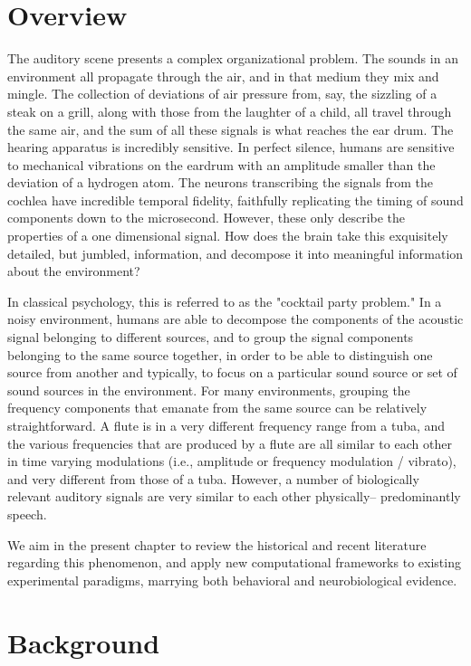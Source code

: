 \section{Overview}

The auditory scene presents a complex organizational problem. The sounds in an environment all propagate through the air, and in that medium they mix and mingle. The collection of deviations of air pressure from, say, the sizzling of a steak on a grill, along with those from the laughter of a child, all travel through the same air, and the sum of all these signals is what reaches the ear drum. The hearing apparatus is incredibly sensitive. In perfect silence, humans are sensitive to mechanical vibrations on the eardrum with an amplitude smaller than the deviation of a hydrogen atom. The neurons transcribing the signals from the cochlea have incredible temporal fidelity, faithfully replicating the timing of sound components down to the microsecond. However, these only describe the properties of a one dimensional signal. How does the brain take this exquisitely detailed, but jumbled, information, and decompose it into meaningful information about the environment?

In classical psychology, this is referred to as the "cocktail party problem." In a noisy environment, humans are able to decompose the components of the acoustic signal belonging to different sources, and to group the signal components belonging to the same source together, in order to be able to distinguish one source from another and typically, to focus on a particular sound source or set of sound sources in the environment. For many environments, grouping the frequency components that emanate from the same source can be relatively straightforward. A flute is in a very different frequency range from a tuba, and the various frequencies that are produced by a flute are all similar to each other in time varying modulations (i.e., amplitude or frequency modulation / vibrato), and very different from those of a tuba. However, a number of biologically relevant auditory signals are very similar to each other physically-- predominantly speech.

We aim in the present chapter to review the historical and recent literature regarding this phenomenon, and apply new computational frameworks to existing experimental paradigms, marrying both behavioral and neurobiological evidence.

\section{Background}

